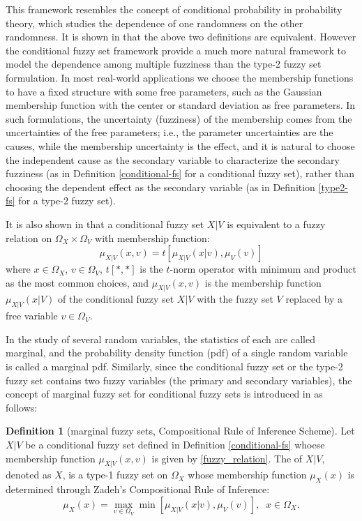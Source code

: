 \documentclass[journal]{IEEEtran}
\theoremstyle{definition}
\newtheorem{definition}{Definition}
\begin{document}
This framework resembles the concept of conditional probability in probability theory, which studies the dependence of one randomness on the other randomness. It is shown in \cite{wang_new_2016} that the above two definitions are equivalent. However the conditional fuzzy set framework provide a much more natural framework to model the dependence among multiple fuzziness than the type-2 fuzzy set formulation.
In most real-world applications we choose the membership functions to have a fixed structure with some free parameters, such as the Gaussian membership function with the center or standard deviation as free parameters. In such formulations, the uncertainty (fuzziness) of the membership comes from the uncertainties of the free parameters; i.e., the parameter uncertainties are the causes, while the membership uncertainty is the effect, and it is natural to choose the independent cause as the secondary variable to characterize the secondary fuzziness (as in Definition \ref{conditional-fs} for a conditional fuzzy set), rather than choosing the dependent effect as the secondary variable (as in Definition \ref{type2-fs} for a type-2 fuzzy set).

It is also shown in \cite{wang_new_2016} that a conditional fuzzy set $X|V$ is equivalent to a fuzzy relation \cite{wang_course_1997} on $\Omega_X\times\Omega_V$ with membership function:
\begin{equation}
\label{fuzzy_relation}
\mu_{X|V}(x,v)=t[\mu_{X|V}(x|v),\mu_V(v)]
\end{equation}
where $x\in\Omega_X$, $v\in\Omega_V$, $t[*,*]$ is the $t$-norm operator with minimum and product as the most common choices, and $\mu_{X|V}(x,v)$ is the membership function $\mu_{X|V}(x|V)$ of the conditional fuzzy set $X|V$ with the fuzzy set $V$  replaced by a free variable $v\in\Omega_V$.

In the study of several random variables, the statistics of each are called marginal, and the probability density function (pdf) of a single random variable is called a marginal pdf. Similarly, since the conditional fuzzy set or the type-2 fuzzy set contains two fuzzy variables (the primary and secondary variables), the concept of marginal fuzzy set for conditional fuzzy sets is introduced in \cite{wang_new_2016} as follows:

\begin{definition}[marginal fuzzy sets, Compositional Rule of Inference Scheme]
\label{marginal-fs}
Let $X|V$ be a conditional fuzzy set defined in Definition \ref{conditional-fs} whoese membership function $\mu_{X|V}(x,v)$ is given by \eqref{fuzzy_relation}. The  of $X|V$, denoted as $X$, is a type-1 fuzzy set on $\Omega_X$ whose membership function $\mu_X(x)$ is determined through Zadeh's Compositional Rule of Inference:
\begin{equation}
\label{marginal_fs}
\mu_X(x)=\max_{v\in\Omega_V}\min[\mu_{X|V}(x|v),\mu_V(v)],\;\;x\in\Omega_X.
\end{equation}
\end{definition}
\end{document}

